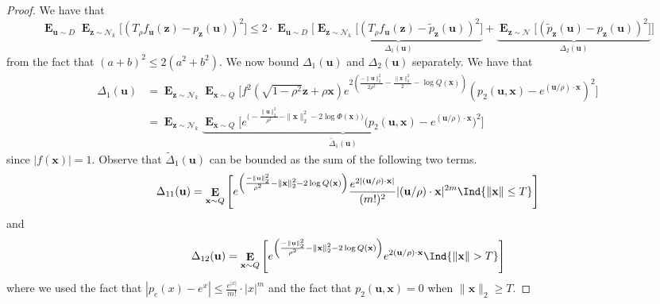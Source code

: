 \documentclass[10pt,a4paper]{article}
\newcommand\twonorm[1]{\|#1\|_2}
\newcommand\norm[1]{\left\| #1 \right\|}
\renewcommand\vec[1]{\mathbf{#1}}
\DeclareMathOperator*{\E}{\mathbf{E}}
\newcommand{\1}{\Ind}
\newcommand{\x}{\vec x}
\newcommand{\vu}{\vec u}
\newcommand{\z}{\vec z}
\newcommand{\Gauss}{\mathcal{N}}
\begin{document}
\begin{proof}
    We have that 
    \[
    \E_{\vu\sim D}\E_{\z\sim \Gauss_k}\bigl[(T_{\rho}f_{\vu}(\z)-p_{\z}(\vu))^2\bigr]\leq 2\cdot \E_{\vu\sim D}\biggl[\underbrace{\E_{\z\sim \Gauss_k}\bigl[(T_{\rho}f_{\vu}(\z)-\tilde{p}_{\z}(\vu))^2\bigr]}_{\Delta_1(\vu)}+\underbrace{\E_{\z\sim \Gauss}\bigl[(\tilde{p}_{\z}(\vu)-{p}_{\z}(\vu))^2\bigr]}_{\Delta_2(\vu)}\biggr]
    \]
    from the fact that $(a+b)^2\leq 2(a^2+b^2)$. We now bound $\Delta_1(\vu)$ and $\Delta_2(\vu)$ separately. We have that 
    \begin{align*}
        \Delta_1(\vu)&=\E_{\z\sim \Gauss_k}\E_{\x\sim Q}\biggl[ f^2(\sqrt{1-\rho^2}\z+\rho\x)e^{2\left(\frac{-\twonorm{\vu}^2}{2\rho^2}-\frac{\twonorm{\x}^2}{2}-\log Q(\x)\right)}\left(p_2(\vu,\x)-e^{ (\vu/\rho)\cdot \x}\right)^2\biggr]\\
         &=\E_{\z\sim \Gauss_k}\underbrace{\E_{\x\sim Q}\biggl[e^{\bigl(-\frac{\twonorm{\vu}^2}{\rho^2}-\twonorm{\x}^2-2\log \Phi(\x)\bigr)}\bigl(p_2(\vu,\x)-e^{(\vu/\rho)\cdot \x}\bigr)^2\biggr]}_{\tilde{\Delta}_{1}(\vu)}
    \end{align*}
    since $|f(\x)|=1$. Observe that $\tilde{\Delta}_1(\vu)$ can be bounded as the sum of the following two terms.
    \[
        \Delta_{11}(\vu)=\E_{\x\sim Q}\left[e^{\left(\frac{-\twonorm{\vu}^2}{\rho^2}-{\twonorm{\x}^2}-2\log Q(\x)\right)}\frac{e^{2|(\vu/\rho)\cdot\x|}}{(m!)^2}|(\vu/\rho)\cdot \x|^{2m}
    \1\{\norm{\x}\leq T\}\right]\] and 
    \[
      \Delta_{12}(\vu)=  \E_{\x\sim Q}\left[e^{\left(\frac{-\twonorm{\vu}^2}{\rho^2}-\twonorm{\x}^2-2\log Q(\x)\right)}e^{2(\vu/\rho)\cdot \x}
      \1\{\norm{\x}> T\}\right]\] where we used the fact that $|p_e(x)-e^{x}|\leq \frac{e^{|x|}}{m!}\cdot |x|^{m}$ and the fact that $p_2(\vu,\x)=0$ when $\twonorm{\x}\geq T$.


\end{proof}
\end{document}
